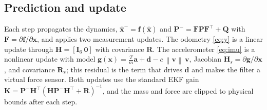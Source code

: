 \documentclass{ieeeaccess}
\newcommand{\norm}[1]{\left\| #1 \right\|}
\newcommand{\vect}[1]{\bm{#1}}
\newcommand{\mat}[1]{\mathbf{#1}}
\begin{document}
\DIFaddend \subsection{Prediction and update}
Each step propagates the dynamics, $\hat{\vect{x}}^-=\vect{f}(\hat{\vect{x}})$
and $\mat{P}^-=\mat{F}\mat{P}\mat{F}^{\!\top}+\mat{Q}$ with
$\mat{F}=\partial\vect{f}/\partial\vect{x}$, and applies two measurement updates.
The odometry \eqref{eq:y} is a linear update through
$\mat{H}=[\mat{I}_6\ \mat{0}]$ with covariance $\mat{R}$. The accelerometer
\eqref{eq:imu} is a nonlinear update with model
$\vect{g}(\vect{x})=\tfrac{T}{m}\vect{a}+\vect{d}-c\,\norm{\vect{v}}\,\vect{v}$,
Jacobian $\mat{H}_s=\partial\vect{g}/\partial\vect{x}$, and covariance
$\mat{R}_s$; this residual is the term that drives $\vect{d}$ and makes the
filter a virtual force sensor. Both updates use the standard EKF gain
$\mat{K}=\mat{P}^-\mat{H}^{\!\top}(\mat{H}\mat{P}^-\mat{H}^{\!\top}+\mat{R})^{-1}$,
and the mass and force are clipped to physical bounds after each step.
\end{document}
